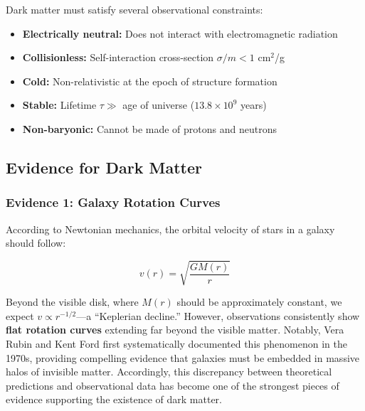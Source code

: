\documentclass[11pt,a4paper]{article}
\begin{document}
Dark matter must satisfy several observational constraints:

\begin{itemize}[noitemsep]
    \item \textbf{Electrically neutral:} Does not interact with electromagnetic radiation
    \item \textbf{Collisionless:} Self-interaction cross-section $\sigma/m < 1$ cm$^2$/g
    \item \textbf{Cold:} Non-relativistic at the epoch of structure formation
    \item \textbf{Stable:} Lifetime $\tau \gg$ age of universe ($13.8 \times 10^9$ years)
    \item \textbf{Non-baryonic:} Cannot be made of protons and neutrons
\end{itemize}

\subsection{Evidence for Dark Matter}

\subsubsection{Evidence 1: Galaxy Rotation Curves}

According to Newtonian mechanics, the orbital velocity of stars in a galaxy should follow:

\begin{equationbox}
\begin{equation}
v(r) = \sqrt{\frac{GM(r)}{r}}
\label{eq:rotation}
\end{equation}
\end{equationbox}

Beyond the visible disk, where $M(r)$ should be approximately constant, we expect $v \propto r^{-1/2}$---a ``Keplerian decline.'' However, observations consistently show \textbf{flat rotation curves} extending far beyond the visible matter. Notably, Vera Rubin and Kent Ford first systematically documented this phenomenon in the 1970s, providing compelling evidence that galaxies must be embedded in massive halos of invisible matter. Accordingly, this discrepancy between theoretical predictions and observational data has become one of the strongest pieces of evidence supporting the existence of dark matter.
\end{document}
